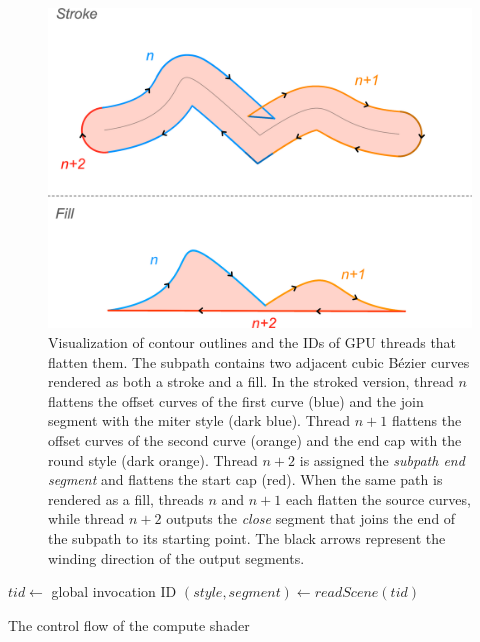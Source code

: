 \documentclass[sigconf, authordraft]{acmart}
\begin{document}
\begin{center}
\begin{figure}
    \includegraphics[scale=0.18]{stroke_threads}
    \caption{Visualization of contour outlines and the IDs of GPU threads that flatten them. The subpath contains two adjacent cubic Bézier curves rendered as both a stroke and a fill. In the stroked version, thread $n$ flattens the offset curves of the first curve (blue) and the join segment with the miter style (dark blue). Thread $n + 1$ flattens the offset curves of the second curve (orange) and the end cap with the round style (dark orange). Thread $n + 2$ is assigned the \emph{subpath end segment} and flattens the start cap (red). When the same path is rendered as a fill, threads $n$ and $n + 1$ each flatten the source curves, while thread $n + 2$ outputs the \emph{close} segment that joins the end of the subpath to its starting point. The black arrows represent the winding direction of the output segments.}
    \label{fig:stroke_threads}
\end{figure}
\end{center}

\begin{algorithm}
  $tid \gets$ global invocation ID\;
  $(style, segment) \gets readScene(tid)$\;
\caption{The control flow of the compute shader}
\label{alg:shader-flow}
\end{algorithm}
\end{document}
